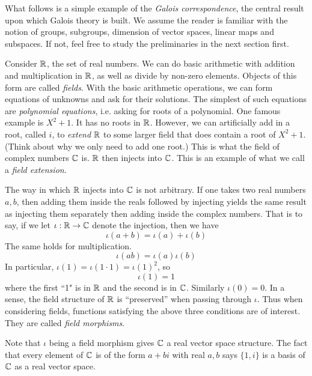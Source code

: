\documentclass[../book.tex]{subfiles}
\begin{document}

What follows is a simple example of the \emph{Galois correspondence},
the central result upon which Galois theory is built. 
We assume the reader is familiar with the notion of groups, subgroups,
dimension of vector spaces, linear maps and subspaces.
If not, feel free to study the preliminaries in the next section first.

Consider $\mathbb{R}$, the set of real numbers.
We can do basic arithmetic 
with addition and multiplication in $\mathbb{R}$,
as well as divide by non-zero elements. 
Objects of this form are called \emph{fields}.
With the basic arithmetic operations, 
we can form equations of unknowns and ask for their solutions.
The simplest of such equations are \emph{polynomial equations},
i.e. asking for roots of a polynomial. 
One famous example is $X^2 + 1$.
It has no roots in $\mathbb{R}$.
However, we can artificially add in a root, called $i$,
to \emph{extend} $\mathbb{R}$ to some larger field that 
does contain a root of $X^2 + 1$.
(Think about why we only need to add one root.)
This is what the field of complex numbers $\mathbb{C}$ is. 
$\mathbb{R}$ then injects into $\mathbb{C}$.
This is an example of what we call a \emph{field extension}. 

The way in which $\mathbb{R}$ injects into $\mathbb{C}$ is not arbitrary. 
If one takes two real numbers $a, b$, 
then adding them inside the reals followed by injecting yields
the same result as injecting them separately then adding inside the complex numbers.
That is to say, if we let $\iota : \mathbb{R} \to \mathbb{C}$ denote the injection,
then we have \[
    \iota(a + b) = \iota(a) + \iota(b)
\]
The same holds for multiplication. \[
    \iota(a b) = \iota(a)\iota(b)
\]
In particular, $\iota(1) = \iota(1\cdot 1) = \iota(1)^2$,
so \[
    \iota(1) = 1
\]
where the first ``1" is in $\mathbb{R}$ and the second is in $\mathbb{C}$. 
Similarly $\iota(0) = 0$.
In a sense, the field structure of $\mathbb{R}$ is ``preserved'' when passing through $\iota$.
Thus when considering fields, 
functions satisfying the above three conditions are of interest. 
They are called \emph{field morphisms}. 

Note that $\iota$ being a field morphism gives $\mathbb{C}$ a real vector space structure.
The fact that every element of $\mathbb{C}$ is of the form $a + b i$ with real $a, b$
says $\{1,i\}$ is a basis of $\mathbb{C}$ as a real vector space. 
\end{document}
